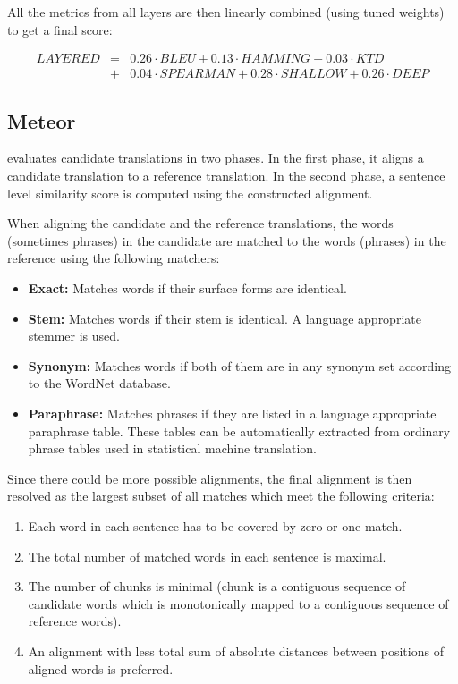All the metrics from all layers are then linearly combined (using tuned weights)
to get a final  score: 

\begin{eqnarray*}
    LAYERED & = & 0.26 \cdot BLEU + 0.13 \cdot HAMMING + 0.03 \cdot KTD \\ 
            & + & 0.04 \cdot SPEARMAN + 0.28 \cdot SHALLOW + 0.26 \cdot DEEP 
\end{eqnarray*}

\subsection{Meteor}

  evaluates candidate translations
in two phases. In the first phase, it aligns a candidate translation to a
reference translation. In the second phase, a sentence level similarity score
is computed using the constructed alignment. 

When aligning the candidate and the reference translations, the words
(sometimes phrases) in the candidate are matched to the words (phrases) in the
reference using the following matchers:

\begin{itemize}
    \item \textbf{Exact:} Matches words if their surface forms are identical.
    \item \textbf{Stem:} Matches words if their stem is identical. A language appropriate
        stemmer is used.
    \item \textbf{Synonym:} Matches words if both of them are in any synonym set according 
        to the WordNet database.
    \item \textbf{Paraphrase:} Matches phrases if they are listed in a language appropriate 
        paraphrase table. These tables can be automatically extracted from ordinary phrase tables
        used in statistical machine translation. 
\end{itemize}

Since there could be more possible alignments, the final alignment is then
resolved as the largest subset of all matches which meet the following
criteria:

\begin{enumerate}
    \item Each word in each sentence has to be covered by zero or one match.
    \item The total number of matched words in each sentence is maximal.
    \item The number of chunks is minimal (chunk is a contiguous sequence of
        candidate words which is monotonically mapped to a contiguous
        sequence of reference words).
    \item An alignment with less total sum of absolute distances between positions
        of aligned words is preferred. 
\end{enumerate}

